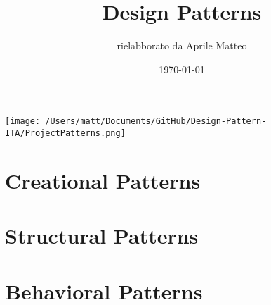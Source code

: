 \documentclass{report}
\title{Design Patterns}
\author{rielabborato da Aprile Matteo}
\date{\today}
\begin{document}
    \maketitle
    \texttt{[image: /Users/matt/Documents/GitHub/Design-Pattern-ITA/ProjectPatterns.png]}
    \tableofcontents

    \part{Creational Patterns}
    
    
    
    
    \part{Structural Patterns}
    
    
    

    \part{Behavioral Patterns}
    
    
    
    
\end{document}

